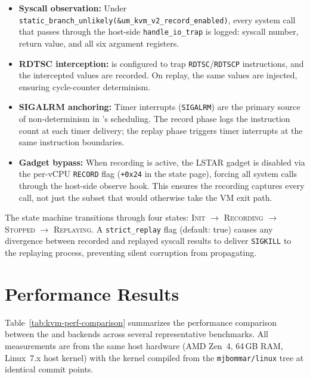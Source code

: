 \begin{itemize}
  \item \textbf{Syscall observation:}
    Under \texttt{static\_branch\_unlikely(\&um\_kvm\_v2\_record\_enabled)},
    every system call that passes through the host-side
    \texttt{handle\_io\_trap} is logged: syscall number, return value,
    and all six argument registers.

  \item \textbf{RDTSC interception:}
    \KVM{} is configured to trap \texttt{RDTSC}/\texttt{RDTSCP}
    instructions, and the intercepted values are recorded.  On replay, the
    same values are injected, ensuring cycle-counter determinism.

  \item \textbf{SIGALRM anchoring:}
    Timer interrupts (\texttt{SIGALRM}) are the primary source of
    non-determinism in \UML{}'s scheduling.  The record phase logs the
    instruction count at each timer delivery; the replay phase triggers
    timer interrupts at the same instruction boundaries.

  \item \textbf{Gadget bypass:}
    When recording is active, the LSTAR gadget is disabled via the
    per-vCPU \texttt{RECORD} flag (\texttt{+0x24} in the state page),
    forcing all system calls through the host-side observe hook.  This
    ensures the recording captures every call, not just the subset that
    would otherwise take the VM exit path.
\end{itemize}

The state machine transitions through four states: \textsc{Init} $\to$
\textsc{Recording} $\to$ \textsc{Stopped} $\to$ \textsc{Replaying}.  A
\texttt{strict\_replay} flag (default: true) causes any divergence between
recorded and replayed syscall results to deliver \texttt{SIGKILL} to the
replaying process, preventing silent corruption from propagating.


\section{Performance Results}
\label{sec:kvm-performance}

Table~\ref{tab:kvm-perf-comparison} summarizes the performance
comparison between the \Seccomp{} and \KVMvTwo{} backends across several
representative benchmarks.  All measurements are from the same host
hardware (AMD Zen~4, 64\,GB RAM, Linux~7.x host kernel) with the \UML{}
kernel compiled from the \texttt{mjbommar/linux} tree at identical
commit points.


